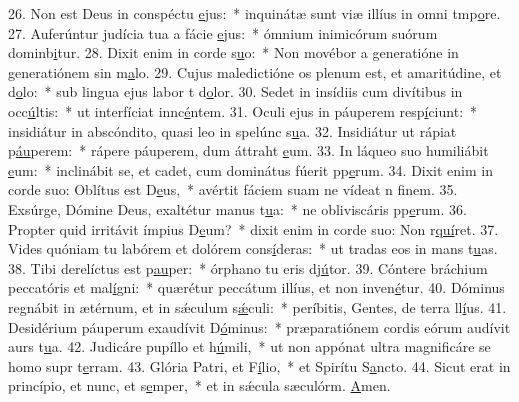 26. Non est Deus in conspéctu \uline{e}jus:~* inquinátæ sunt viæ illíus in omni tmp\uline{o}re.
27. Auferúntur judícia tua a fácie \uline{e}jus:~* ómnium inimicórum suórum dominb\uline{i}tur.
28. Dixit enim in corde s\uline{u}o:~* Non movébor a generatióne in generatiónem sin m\uline{a}lo.
29. Cujus maledictióne os plenum est, et amaritúdine, et d\uline{o}lo:~* sub lingua ejus labor t d\uline{o}lor.
30. Sedet in insídiis cum divítibus in occ\uline{ú}ltis:~* ut interfíciat innc\uline{é}ntem.
31. Oculi ejus in páuperem resp\uline{í}ciunt:~* insidiátur in abscóndito, quasi leo in spelúnc s\uline{u}a.
32. Insidiátur ut rápiat p\uline{áu}perem:~* rápere páuperem, dum áttraht \uline{e}um.
33. In láqueo suo humiliábit \uline{e}um:~* inclinábit se, et cadet, cum dominátus fúerit pp\uline{e}rum.
34. Dixit enim in corde suo: Oblítus est D\uline{e}us,~* avértit fáciem suam ne vídeat n f\uline{i}nem.
35. Exsúrge, Dómine Deus, exaltétur manus t\uline{u}a:~* ne obliviscáris pp\uline{e}rum.
36. Propter quid irritávit ímpius D\uline{e}um?~* dixit enim in corde suo: Non r\uline{quí}ret.
37. Vides quóniam tu labórem et dolórem cons\uline{í}deras:~* ut tradas eos in mans t\uline{u}as.
38. Tibi derelíctus est p\uline{au}per:~* órphano tu eris dj\uline{ú}tor.
39. Cóntere bráchium peccatóris et mal\uline{í}gni:~* quærétur peccátum illíus, et non inven\uline{é}tur.
40. Dóminus regnábit in ætérnum, et in sǽculum s\uline{ǽ}culi:~* períbitis, Gentes, de terra ll\uline{í}us.
41. Desidérium páuperum exaudívit D\uline{ó}minus:~* præparatiónem cordis eórum audívit aurs t\uline{u}a.
42. Judicáre pupíllo et h\uline{ú}mili,~* ut non appónat ultra magnificáre se homo supr t\uline{e}rram.
43. Glória Patri, et F\uline{í}lio,~* et Spirítu S\uline{a}ncto.
44. Sicut erat in princípio, et nunc, et s\uline{e}mper,~* et in sǽcula sæculórm. \uline{A}men.
